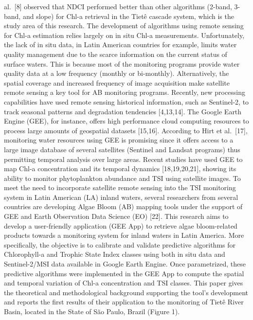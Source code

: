 \documentclass[
  12pt]{article}
\begin{document}
al.~{[}8{]} observed that NDCI performed better than other algorithms
(2-band, 3-band, and slope) for Chl-a retrieval in the Tietê cascade
system, which is the study area of this research. The development of
algorithms using remote sensing for Chl-a estimation relies largely on
in situ Chl-a measurements. Unfortunately, the lack of in situ data, in
Latin American countries for example, limits water quality management
due to the scarce information on the current status of surface waters.
This is because most of the monitoring programs provide water quality
data at a low frequency (monthly or bi-monthly). Alternatively, the
spatial coverage and increased frequency of image acquisition make
satellite remote sensing a key tool for AB monitoring programs.
Recently, new processing capabilities have used remote sensing
historical information, such as Sentinel-2, to track seasonal patterns
and degradation tendencies {[}4,13,14{]}. The Google Earth Engine (GEE),
for instance, offers high performance cloud computing resources to
process large amounts of geospatial datasets {[}15,16{]}. According to
Hirt et al.~{[}17{]}, monitoring water resources using GEE is promising
since it offers access to a large image database of several satellites
(Sentinel and Landsat programs) thus permitting temporal analysis over
large areas. Recent studies have used GEE to map Chl-a concentration and
its temporal dynamics {[}18,19,20,21{]}, showing its ability to monitor
phytoplankton abundance and TSI using satellite images. To meet the need
to incorporate satellite remote sensing into the TSI monitoring system
in Latin American (LA) inland waters, several researchers from several
countries are developing Algae Bloom (AB) mapping tools under the
support of GEE and Earth Observation Data Science (EO) {[}22{]}. This
research aims to develop a user-friendly application (GEE App) to
retrieve algae bloom-related products towards a monitoring system for
inland waters in Latin America. More specifically, the objective is to
calibrate and validate predictive algorithms for Chlorophyll-a and
Trophic State Index classes using both in situ data and Sentinel-2/MSI
data available in Google Earth Engine. Once parametrized, these
predictive algorithms were implemented in the GEE App to compute the
spatial and temporal variation of Chl-a concentration and TSI classes.
This paper gives the theoretical and methodological background
supporting the tool's development and reports the first results of their
application to the monitoring of Tietê River Basin, located in the State
of São Paulo, Brazil (Figure 1).
\end{document}
